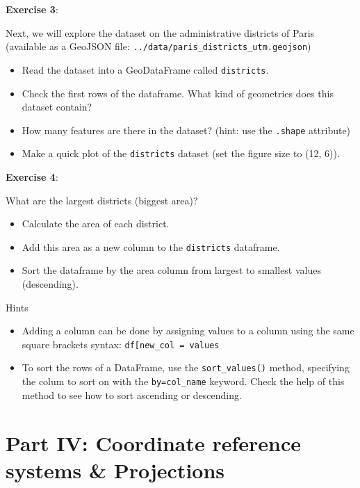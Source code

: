 \documentclass[
  letterpaper,
  DIV=11,
  numbers=noendperiod]{scrreprt}
\providecommand{\tightlist}{%
  \setlength{\itemsep}{0pt}\setlength{\parskip}{0pt}}\usepackage{longtable,booktabs,array}
\begin{document}
\textbf{Exercise 3}:

Next, we will explore the dataset on the administrative districts of
Paris (available as a GeoJSON file:
\texttt{../data/paris\_districts\_utm.geojson})

\begin{itemize}
\tightlist
\item
  Read the dataset into a GeoDataFrame called \texttt{districts}.
\item
  Check the first rows of the dataframe. What kind of geometries does
  this dataset contain?
\item
  How many features are there in the dataset? (hint: use the
  \texttt{.shape} attribute)
\item
  Make a quick plot of the \texttt{districts} dataset (set the figure
  size to (12, 6)).
\end{itemize}

\textbf{Exercise 4}:

What are the largest districts (biggest area)?

\begin{itemize}
\tightlist
\item
  Calculate the area of each district.
\item
  Add this area as a new column to the \texttt{districts} dataframe.
\item
  Sort the dataframe by the area column from largest to smallest values
  (descending).
\end{itemize}

Hints

\begin{itemize}
\tightlist
\item
  Adding a column can be done by assigning values to a column using the
  same square brackets syntax:
  \texttt{df{[}\textquotesingle{}new\_col\textquotesingle{}{]}\ =\ values}
\item
  To sort the rows of a DataFrame, use the \texttt{sort\_values()}
  method, specifying the colum to sort on with the
  \texttt{by=\textquotesingle{}col\_name\textquotesingle{}} keyword.
  Check the help of this method to see how to sort ascending or
  descending.
\end{itemize}

\section{Part IV: Coordinate reference systems \&
Projections}\label{part-iv-coordinate-reference-systems-projections}
\end{document}

